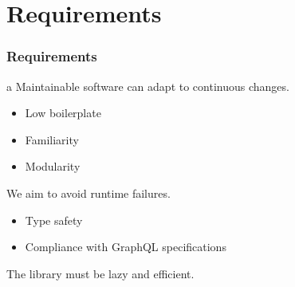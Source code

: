 \section{Requirements}

\begin{frame}\frametitle{Requirements}  

\begin{itemize}
     a Maintainable software can adapt to continuous changes.
    \begin{itemize}
        \item Low boilerplate
        \item Familiarity
        \item Modularity
    \end{itemize}
     We aim to avoid runtime failures. 
    \begin{itemize}
        \item Type safety    
        \item Compliance with GraphQL specifications
    \end{itemize}
     The library must be lazy and efficient.
\end{itemize}

\end{frame}